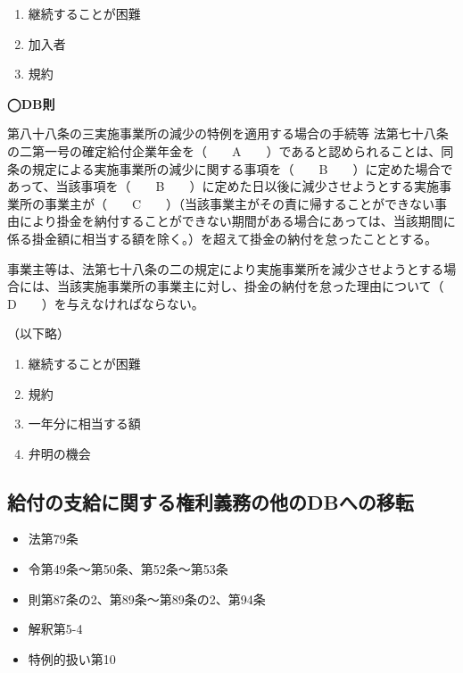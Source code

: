 \begin{answerbox}
  \begin{enumerate}[A: ]
    \item 継続することが困難
    \item 加入者
    \item 規約
  \end{enumerate}
\end{answerbox}


\begin{fillblank}[年金1 2021 問題1(1)C、D　\&　年金2 H28 問題1(3)A,C,J.K]
  \noindent \textbf{◯DB則}
  \begin{lawstructure}
    \begin{lawarticle}{第八十八条の三}{実施事業所の減少の特例を適用する場合の手続等}
      法第七十八条の二第一号の確定給付企業年金を（　　A　　）であると認められることは、同条の規定による実施事業所の減少に関する事項を（　　B　　）に定めた場合であって、当該事項を（　　B　　）に定めた日以後に減少させようとする実施事業所の事業主が（　　C　　）（当該事業主がその責に帰することができない事由により掛金を納付することができない期間がある場合にあっては、当該期間に係る掛金額に相当する額を除く。）を超えて掛金の納付を怠ったこととする。

      事業主等は、法第七十八条の二の規定により実施事業所を減少させようとする場合には、当該実施事業所の事業主に対し、掛金の納付を怠った理由について（　　D　　）を与えなければならない。

    （以下略）
    \end{lawarticle}
  \end{lawstructure}
\end{fillblank}

\begin{answerbox}
  \begin{enumerate}[A: ]
    \item 継続することが困難
    \item 規約
    \item 一年分に相当する額
    \item 弁明の機会
  \end{enumerate}
\end{answerbox}

\newpage


\subsection{給付の支給に関する権利義務の他のDBへの移転}


\begin{InyouJobunbox}
  \begin{itemize}
    \item 法第79条
    \item 令第49条〜第50条、第52条〜第53条
    \item 則第87条の2、第89条〜第89条の2、第94条
    \item 解釈第5-4
    \item 特例的扱い第10
  \end{itemize}
\end{InyouJobunbox}

